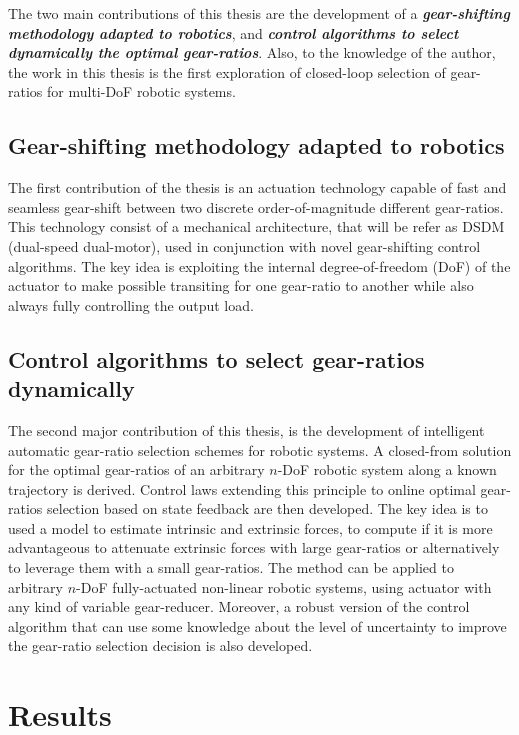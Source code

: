The two main contributions of this thesis are the development of a \emph{\textbf{gear-shifting methodology adapted to robotics}}, and \emph{\textbf{control algorithms to select dynamically the optimal gear-ratios}}. Also, to the knowledge of the author, the work in this thesis is the first exploration of closed-loop selection of gear-ratios for multi-DoF robotic systems. 


\subsection{Gear-shifting methodology adapted to robotics}

The first contribution of the thesis is an actuation technology capable of fast and seamless gear-shift between two discrete order-of-magnitude different gear-ratios. This technology consist of a mechanical architecture, that will be refer as DSDM (dual-speed dual-motor), used in conjunction with novel gear-shifting control algorithms. The key idea is exploiting the internal degree-of-freedom (DoF) of the actuator to make possible transiting for one gear-ratio to another while also always fully controlling the output load. 

\subsection{Control algorithms to select gear-ratios dynamically}

The second major contribution of this thesis, is the development of intelligent automatic gear-ratio selection schemes for robotic systems. A closed-from solution for the optimal gear-ratios of an arbitrary $n$-DoF robotic system along a known trajectory is derived. Control laws extending this principle to online optimal gear-ratios selection based on state feedback are then developed. The key idea is to used a model to estimate intrinsic and extrinsic forces, to compute if it is more advantageous to attenuate extrinsic forces with large gear-ratios or alternatively to leverage them with a small gear-ratios. The method can be applied to arbitrary $n$-DoF fully-actuated non-linear robotic systems, using actuator with any kind of variable gear-reducer. Moreover, a robust version of the control algorithm that can use some knowledge about the level of uncertainty to improve the gear-ratio selection decision is also developed.


\section{Results}
\label{sec:mainresults}

